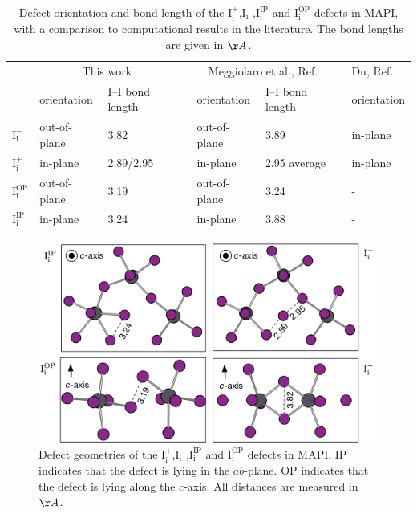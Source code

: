 \begin{table}[h!]\centering
\begin{tabular}{llllllll}\toprule
\phantom{abcd}&\multicolumn{2}{c}{This work} &\phantom{a} &\multicolumn{2}{c}{Meggiolaro et al., Ref. \cite{Meggiolaro2018}}&\phantom{a} & Du, Ref. \cite{Du2015} \\
\cline{2-3} \cline{5-6} \cline{8-8}
& orientation & I--I bond length && orientation & I--I bond length  && orientation \\  
\midrule
$\mathrm{I}_\mathrm{i}^-$ &  out-of-plane & 3.82  &&  out-of-plane & 3.89 && in-plane \\
$\mathrm{I}_\mathrm{i}^+$ & in-plane & 2.89/2.95 && in-plane & 2.95 average && in-plane \\
$\mathrm{I}_\mathrm{i}^\mathrm{OP}$ & out-of-plane & 3.19 && out-of-plane & 3.24 && - \\
$\mathrm{I}_\mathrm{i}^\mathrm{IP}$ & in-plane & 3.24 && in-plane & 3.88 && - \\
\end{tabular} 
\caption[Defect orientation and bond length of the $\mathrm{I}_\mathrm{i}^+$, $\mathrm{I}_\mathrm{i}^-$, $\mathrm{I}_\mathrm{i}^\mathrm{IP}$ and $\mathrm{I}_\mathrm{i}^\mathrm{OP}$ defects in MAPI]{\label{compare_geoms}Defect orientation and bond length of the $\mathrm{I}_\mathrm{i}^+$,$\mathrm{I}_\mathrm{i}^-$,$\mathrm{I}_\mathrm{i}^\mathrm{IP}$ and $\mathrm{I}_\mathrm{i}^\mathrm{OP}$ defects in MAPI, with a comparison to computational results in the literature. The bond lengths are given in $\AA$.}
\end{table}

\begin{figure}[h!]
\centering
  \includegraphics[width=1.0\columnwidth]{figures/ch6/defect_geometries.png}
  \caption[Defect geometries of the $\mathrm{I}_\mathrm{i}^+$,$\mathrm{I}_\mathrm{i}^-$,$\mathrm{I}_\mathrm{i}^\mathrm{IP}$ and $\mathrm{I}_\mathrm{i}^\mathrm{OP}$ defects in MAPI]{Defect geometries of the $\mathrm{I}_\mathrm{i}^+$,$\mathrm{I}_\mathrm{i}^-$,$\mathrm{I}_\mathrm{i}^\mathrm{IP}$ and $\mathrm{I}_\mathrm{i}^\mathrm{OP}$ defects in MAPI. IP indicates that the defect is lying in the $ab$-plane. OP indicates that the defect is lying along the $c$-axis. All distances are measured in $\AA$.}
\label{relaxation_workflow}
\end{figure}


